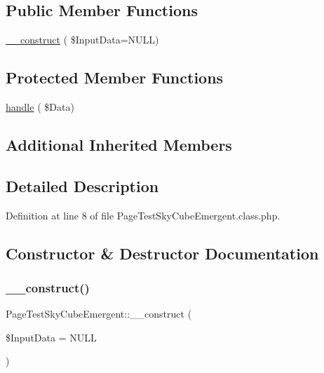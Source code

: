 \subsection*{Public Member Functions}
\begin{DoxyCompactItemize}
\item 
\hyperlink{class_page_test_sky_cube_emergent_ab90c6af6f164a539a33851108f7b8eab}{\+\_\+\+\_\+construct} ( \$Input\+Data=N\+U\+LL)
\end{DoxyCompactItemize}
\subsection*{Protected Member Functions}
\begin{DoxyCompactItemize}
\item 
\hyperlink{class_page_test_sky_cube_emergent_ae647129c2df8c0183927f0eaecd3a690}{handle} ( \$Data)
\end{DoxyCompactItemize}
\subsection*{Additional Inherited Members}


\subsection{Detailed Description}


Definition at line 8 of file Page\+Test\+Sky\+Cube\+Emergent.\+class.\+php.



\subsection{Constructor \& Destructor Documentation}
\mbox{\label{class_page_test_sky_cube_emergent_ab90c6af6f164a539a33851108f7b8eab}} 
\subsubsection{\texorpdfstring{\+\_\+\+\_\+construct()}{\_\_construct()}}
{\footnotesize\ttfamily Page\+Test\+Sky\+Cube\+Emergent\+::\+\_\+\+\_\+construct (\begin{DoxyParamCaption}\item[{}]{\$\+Input\+Data = {\ttfamily NULL} }\end{DoxyParamCaption})}

